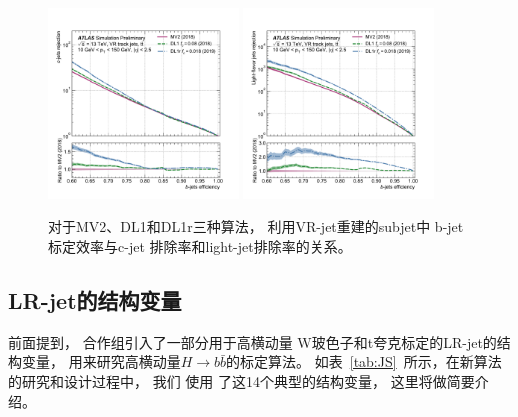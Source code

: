 \begin{figure}  
  \begin{center}
    \includegraphics[width=0.45\textwidth]{figuresXbb/VRDL1r2.pdf}
    \includegraphics[width=0.45\textwidth]{figuresXbb/VRDL1r1.pdf}
  \end{center}
  \caption{
 对于MV2、DL1和DL1r三种算法，
利用VR-jet重建的subjet中
b-jet标定效率与c-jet
排除率和light-jet排除率的关系。
   }
  \label{fig:VRDL1r}
\end{figure}

\subsection{LR-jet的结构变量}
\label{sec:XbbORJSS}


前面提到，
合作组引入了一部分用于高横动量
W玻色子和t夸克标定的LR-jet的结构变量，
用来研究高横动量$H\rightarrow b\bar{b}$的标定算法。
如表~\ref{tab:JS}~所示，在新算法的研究和设计过程中，
我们
使用
了这14个典型的结构变量，
这里将做简要介绍。

